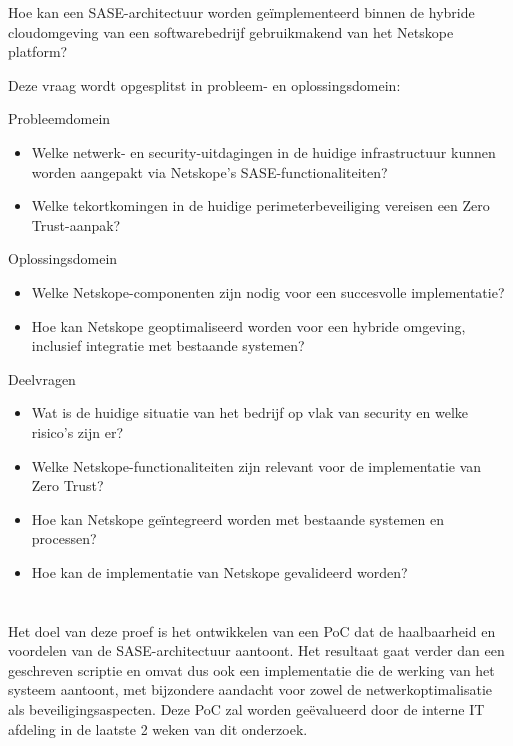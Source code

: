 Hoe kan een SASE-architectuur worden geïmplementeerd binnen de hybride cloudomgeving van een softwarebedrijf gebruikmakend van het Netskope platform?

Deze vraag wordt opgesplitst in probleem- en oplossingsdomein:

Probleemdomein
\begin{itemize}
  \item Welke netwerk- en security-uitdagingen in de huidige infrastructuur kunnen worden aangepakt via Netskope's SASE-functionaliteiten?
  \item Welke tekortkomingen in de huidige perimeterbeveiliging vereisen een Zero Trust-aanpak?
\end{itemize}

Oplossingsdomein
\begin{itemize}
  \item Welke Netskope-componenten zijn nodig voor een succesvolle implementatie?
  \item Hoe kan Netskope geoptimaliseerd worden voor een hybride omgeving, inclusief integratie met bestaande systemen?
\end{itemize}

Deelvragen
\begin{itemize}
  \item Wat is de huidige situatie van het bedrijf op vlak van security en welke risico’s zijn er?
  \item Welke Netskope-functionaliteiten zijn relevant voor de implementatie van Zero Trust?
  \item Hoe kan Netskope geïntegreerd worden met bestaande systemen en processen?
  \item Hoe kan de implementatie van Netskope gevalideerd worden?
\end{itemize}

\section{}%
\label{sec:onderzoeksdoelstelling}


Het doel van deze proef is het ontwikkelen van een PoC dat de haalbaarheid en voordelen van de SASE-architectuur aantoont. Het resultaat gaat verder dan een geschreven scriptie en omvat dus ook een implementatie die de werking van het systeem aantoont, met bijzondere aandacht voor zowel de netwerkoptimalisatie als beveiligingsaspecten. Deze PoC zal worden geëvalueerd door de interne IT afdeling in de laatste 2 weken van dit onderzoek.

